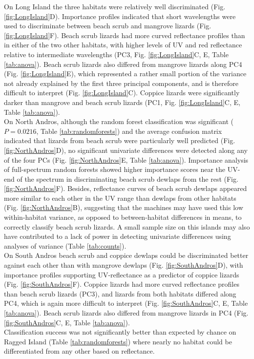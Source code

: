 On Long Island the three habitats were relatively well discriminated (Fig. \ref{fig:LongIsland}D). Importance profiles indicated that short wavelengths were used to discriminate between beach scrub and mangrove lizards (Fig. \ref{fig:LongIsland}F). Beach scrub lizards had more curved reflectance profiles than in either of the two other habitats, with higher levels of UV and red reflectance relative to intermediate wavelengths (PC3, Fig. \ref{fig:LongIsland}C, E, Table \ref{tab:anova}). Beach scrub lizards also differed from mangrove lizards along PC4 (Fig. \ref{fig:LongIsland}E), which represented a rather small portion of the variance not already explained by the first three principal components, and is therefore difficult to interpret (Fig. \ref{fig:LongIsland}C). Coppice lizards were significantly darker than mangrove and beach scrub lizards (PC1, Fig. \ref{fig:LongIsland}C, E, Table \ref{tab:anova}).\\ 

On North Andros, although the random forest classification was significant ($P = 0.0216$, Table \ref{tab:randomforests}) and the average confusion matrix indicated that lizards from beach scrub were particularly well predicted (Fig. \ref{fig:NorthAndros}D), no significant univariate differences were detected along any of the four PCs (Fig. \ref{fig:NorthAndros}E, Table \ref{tab:anova}). Importance analysis of full-spectrum random forests showed higher importance scores near the UV-end of the spectrum in discriminating beach scrub dewlaps from the rest (Fig. \ref{fig:NorthAndros}F). Besides, reflectance curves of beach scrub dewlaps appeared more similar to each other in the UV range than dewlaps from other habitats (Fig. \ref{fig:NorthAndros}B), suggesting that the machines may have used this low within-habitat variance, as opposed to between-habitat differences in means, to correctly classify beach scrub lizards. A small sample size on this islands may also have contributed to a lack of power in detecting univariate differences using analyses of variance (Table \ref{tab:counts}).\\

On South Andros beach scrub and coppice dewlaps could be discriminated better against each other than with mangrove dewlaps (Fig. \ref{fig:SouthAndros}D), with importance profiles supporting UV-reflectance as a predictor of coppice lizards (Fig. \ref{fig:SouthAndros}F). Coppice lizards had more curved reflectance profiles than beach scrub lizards (PC3), and lizards from both habitats differed along PC4, which is again more difficult to interpret (Fig. \ref{fig:SouthAndros}C, E, Table \ref{tab:anova}). Beach scrub lizards also differed from mangrove lizards in PC4 (Fig. \ref{fig:SouthAndros}C, E, Table \ref{tab:anova}).\\

Classification success was not significantly better than expected by chance on Ragged Island (Table \ref{tab:randomforests}) where nearly no habitat could be differentiated from any other based on reflectance.